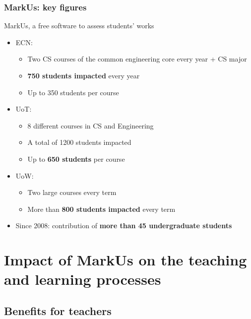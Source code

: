 \documentclass[hyperref,french,usenames,xcolor=dvipsnames]{beamer}
\begin{document}

\frame
{
  \frametitle{MarkUs: key figures}

\begin{block}{MarkUs, a free software to assess students' works}
\begin{itemize}
\item ECN: 
\begin{itemize}
\item Two CS courses of the common engineering core every year + CS major 
\item \textbf{750 students impacted} every year
\item Up to 350 students per course
\end{itemize}
\item UoT: 
\begin{itemize}
\item 8 different courses in CS and Engineering
\item A total of 1200 students impacted 
\item Up to \textbf{650 students} per course 
\end{itemize}
\item UoW: 
\begin{itemize}
\item Two large courses every term 
\item More than \textbf{800 students impacted} every term
\end{itemize}
\item Since 2008: contribution of \textbf{more than 45 undergraduate students} 
\end{itemize}
\end{block}
}

\section*{Impact of MarkUs on the teaching and learning processes}


\subsection*{Benefits for teachers}

\end{document}
